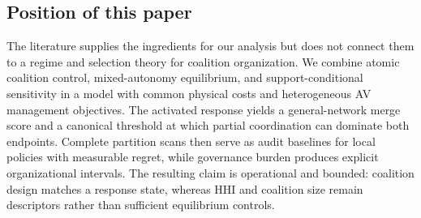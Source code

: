 \subsection{Position of this paper}

The literature supplies the ingredients for our analysis but does not connect
them to a regime and selection theory for coalition organization. We combine
atomic coalition control, mixed-autonomy equilibrium, and support-conditional
sensitivity in a model with common physical costs and heterogeneous AV
management objectives. The activated response yields a general-network merge
score and a canonical threshold at which partial coordination can dominate
both endpoints. Complete partition scans then serve as audit baselines for
local policies with measurable regret, while governance burden produces
explicit organizational intervals. The resulting claim is operational and
bounded: coalition design matches a response state, whereas HHI and coalition
size remain descriptors rather than sufficient equilibrium controls.
